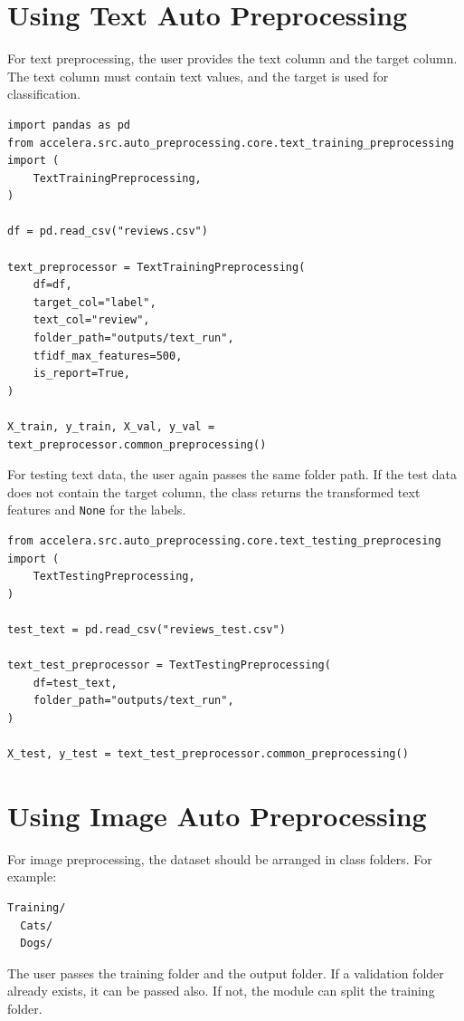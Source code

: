 \documentclass[12pt,a4paper]{report}
\begin{document}
\section{Using Text Auto Preprocessing}
For text preprocessing, the user provides the text column and the target
column. The text column must contain text values, and the target is used for
classification.

\begin{lstlisting}[style=code,caption={Calling text training preprocessing}]
import pandas as pd
from accelera.src.auto_preprocessing.core.text_training_preprocessing import (
    TextTrainingPreprocessing,
)

df = pd.read_csv("reviews.csv")

text_preprocessor = TextTrainingPreprocessing(
    df=df,
    target_col="label",
    text_col="review",
    folder_path="outputs/text_run",
    tfidf_max_features=500,
    is_report=True,
)

X_train, y_train, X_val, y_val = text_preprocessor.common_preprocessing()
\end{lstlisting}

For testing text data, the user again passes the same folder path. If the test
data does not contain the target column, the class returns the transformed text
features and \texttt{None} for the labels.

\begin{lstlisting}[style=code,caption={Calling text testing preprocessing}]
from accelera.src.auto_preprocessing.core.text_testing_preprocesing import (
    TextTestingPreprocessing,
)

test_text = pd.read_csv("reviews_test.csv")

text_test_preprocessor = TextTestingPreprocessing(
    df=test_text,
    folder_path="outputs/text_run",
)

X_test, y_test = text_test_preprocessor.common_preprocessing()
\end{lstlisting}

\section{Using Image Auto Preprocessing}
For image preprocessing, the dataset should be arranged in class folders. For
example:

\begin{verbatim}
Training/
  Cats/
  Dogs/
\end{verbatim}

The user passes the training folder and the output folder. If a validation
folder already exists, it can be passed also. If not, the module can split the
training folder.
\end{document}
